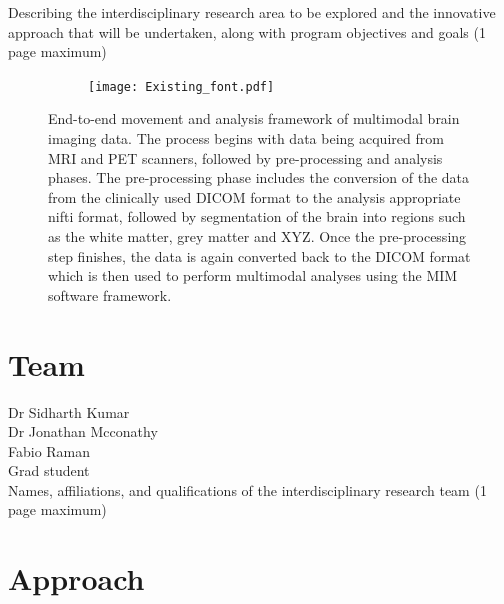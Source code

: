 \documentclass[11pt]{article}
\begin{document}

Describing the interdisciplinary research area to be explored and the innovative approach that will be undertaken, along with program objectives and goals (1 page maximum)\\


\begin{figure}
	\centering
	\begin{subfigure}{1\textwidth}
		\centering
		\texttt{[image: Existing\_font.pdf]}
	\end{subfigure}
	\caption {End-to-end movement and analysis framework of multimodal brain imaging data. The process begins with data being acquired from MRI and PET scanners, followed by pre-processing and analysis phases. The pre-processing phase includes the conversion of the data from the clinically used DICOM format to the analysis appropriate nifti format, followed by segmentation of the brain into regions such as the white matter, grey matter and XYZ. Once the pre-processing step finishes, the data is again converted back to the DICOM format which is then used to perform multimodal analyses using the MIM software framework.}
	\label{fig:theta_sens}
\end{figure}

\section{Team}
Dr Sidharth Kumar \\
Dr Jonathan Mcconathy \\
Fabio Raman \\
Grad student \\
Names, affiliations, and qualifications of the interdisciplinary research team (1 page maximum)

\section{Approach}
\end{document}
